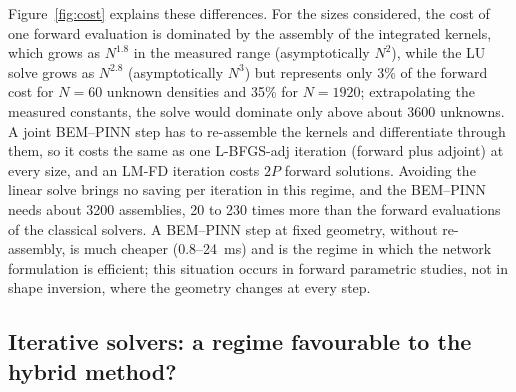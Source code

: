 \documentclass[11pt,twoside]{article}
\begin{document}
Figure~\ref{fig:cost} explains these differences. For the sizes considered, the cost of one forward evaluation is dominated by the assembly of the integrated kernels, which grows as $N^{1.8}$ in the measured range (asymptotically $N^2$), while the LU solve grows as $N^{2.8}$ (asymptotically $N^3$) but represents only 3\% of the forward cost for $N=60$ unknown densities and 35\% for $N=1920$; extrapolating the measured constants, the solve would dominate only above about 3600 unknowns. A joint BEM--PINN step has to re-assemble the kernels and differentiate through them, so it costs the same as one L-BFGS-adj iteration (forward plus adjoint) at every size, and an LM-FD iteration costs $2P$ forward solutions. Avoiding the linear solve brings no saving per iteration in this regime, and the BEM--PINN needs about 3200 assemblies, 20 to 230 times more than the forward evaluations of the classical solvers. A BEM--PINN step at fixed geometry, without re-assembly, is much cheaper (0.8--24~ms) and is the regime in which the network formulation is efficient; this situation occurs in forward parametric studies, not in shape inversion, where the geometry changes at every step.

\subsection{Iterative solvers: a regime favourable to the hybrid method?}\label{sec:iterative}
\end{document}
